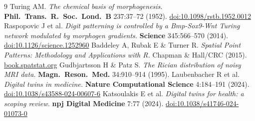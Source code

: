 \documentclass[10.5pt,a4paper]{article}
\begin{document}
\begin{thebibliography}{9}
\scriptsize
\setlength{\itemsep}{1.5pt}
     Turing AM. \emph{The chemical basis of morphogenesis.} \textbf{Phil.\ Trans.\ R.\ Soc.\ Lond.\ B} 237:37--72 (1952). \href{https://doi.org/10.1098/rstb.1952.0012}{doi:10.1098/rstb.1952.0012}
     Raspopovic J et al. \emph{Digit patterning is controlled by a Bmp-Sox9-Wnt Turing network modulated by morphogen gradients.} \textbf{Science} 345:566--570 (2014). \href{https://doi.org/10.1126/science.1252960}{doi:10.1126/science.1252960}
     Baddeley A, Rubak E \& Turner R. \emph{Spatial Point Patterns: Methodology and Applications with R.} Chapman \& Hall/CRC (2015). \href{https://book.spatstat.org/}{book.spatstat.org}
     Gudbjartsson H \& Patz S. \emph{The Rician distribution of noisy MRI data.} \textbf{Magn.\ Reson.\ Med.} 34:910--914 (1995).
     Laubenbacher R et al. \emph{Digital twins in medicine.} \textbf{Nature Computational Science} 4:184--191 (2024). \href{https://doi.org/10.1038/s43588-024-00607-6}{doi:10.1038/s43588-024-00607-6}
     Katsoulakis E et al. \emph{Digital twins for health: a scoping review.} \textbf{npj Digital Medicine} 7:77 (2024). \href{https://doi.org/10.1038/s41746-024-01073-0}{doi:10.1038/s41746-024-01073-0}
\end{thebibliography}
\end{document}
